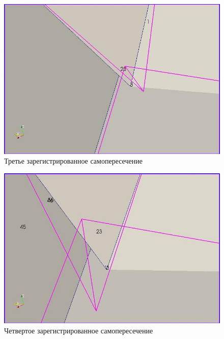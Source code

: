 \documentclass[a4paper,12pt, titlepage]{article}
\begin{document}
\begin{flushleft}
  \begin{figure}[h]
    \includegraphics[clip, width=13cm]{img/consections-3.jpeg}
    \caption{Третье зарегистрированное самопересечение}\label{consections-3}
  \end{figure}
\end{flushleft}
\begin{flushleft}
  \begin{figure}[h]
    \includegraphics[clip, width=13cm]{img/consections-4.jpeg}
    \caption{Четвертое зарегистрированное самопересечение}\label{consections-4}
  \end{figure}
\end{flushleft}
\end{document}
